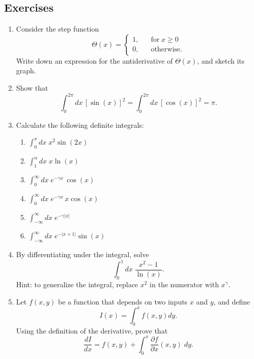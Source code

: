 \documentclass[10pt,a4paper]{article}
\begin{document}
\pagebreak
\subsection{Exercises}\label{exercises}
\begin{enumerate}
\item Consider the step function
  \begin{equation}
    \Theta(x) = \left\{\begin{array}{ll} 1, &\;\;\;\textrm{for} \; x \ge 0\\ 0,&\;\;\; \textrm{otherwise.}\end{array}\right.
  \end{equation}
  Write down an expression for the antiderivative of $\Theta(x)$, and
  sketch its graph.

\item Show that
  \begin{equation}
    \int_0^{2\pi} dx\, [\sin(x)]^2 = \int_0^{2\pi} dx\,
        [\cos(x)]^2 = \pi.
  \end{equation}

\item Calculate the following definite integrals:
  \begin{enumerate}
  \item $\displaystyle\int_{0}^\pi dx\; x^2 \sin(2x)$
  \item $\displaystyle\int_{1}^\alpha dx\; x \ln(x)$
  \item $\displaystyle\int_0^\infty dx\;e^{-\gamma x} \, \cos(x)$
  \item $\displaystyle\int_0^\infty dx\;e^{-\gamma x} \, x \cos(x)$
  \item $\displaystyle\int_{-\infty}^\infty dx\;e^{-\gamma |x|}$
  \item $\displaystyle \int_{-\infty}^\infty dx \;e^{-|x+1|} \sin(x)$
  \end{enumerate}

\item
  By differentiating under the integral, solve
\begin{equation*}
  \int_0^1 dx\; \frac{x^2-1}{\ln(x)}.
\end{equation*}
Hint: to generalize the integral, replace $x^2$ in the numerator with
$x^\gamma$.

\item
Let $f(x,y)$ be a function that depends on two inputs $x$ and $y$,
and define
\begin{equation}
  I(x) = \int_0^x f(x,y) dy.
\end{equation}
Using the definition of the derivative, prove that
\begin{equation}
  \frac{dI}{dx} = f(x,y) + \int_0^x \frac{\partial f}{\partial x}(x,y) \;dy.
\end{equation}


\end{enumerate}
\end{document}
